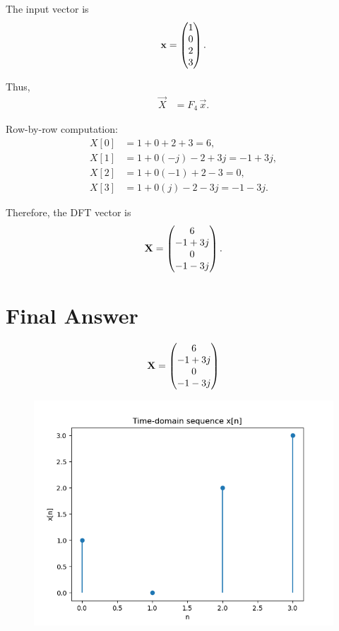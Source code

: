 \documentclass[12pt]{article}
\begin{document}
The input vector is
\begin{align}
\mathbf{x} = \begin{pmatrix}1 \\ 0 \\ 2 \\ 3\end{pmatrix}.
\end{align}

Thus,
\begin{align}
\vec{X} &= F_4 \, \vec{x}.
\end{align}

Row-by-row computation:
\begin{align}
X[0] &= 1+0+2+3 = 6, \\
X[1] &= 1 + 0(-j) - 2 + 3j = -1+3j, \\
X[2] &= 1 + 0(-1) + 2 - 3 = 0, \\
X[3] &= 1 + 0(j) - 2 - 3j = -1-3j.
\end{align}

Therefore, the DFT vector is
\begin{align}
\mathbf{X} = \begin{pmatrix}6 \\ -1+3j \\ 0 \\ -1-3j\end{pmatrix}.
\end{align}

\section*{Final Answer}
\begin{align}
\mathbf{X} = \begin{pmatrix}6 \\ -1+3j \\ 0 \\ -1-3j\end{pmatrix}
\end{align}

\begin{figure}[H]
    \centering
    \includegraphics[width=0.7\columnwidth]{figs/fig3.png}
    \caption{}
    \label{fig:placeholder}
\end{figure}
\end{document}

